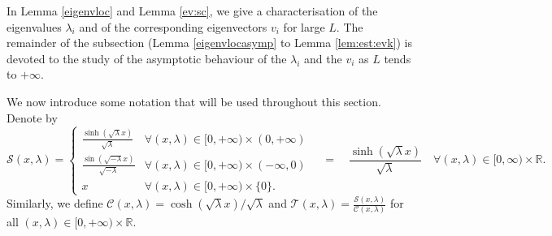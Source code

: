 \documentclass[11pt]{article}
\theoremstyle{plain}
\begin{document}
In Lemma \ref{eigenvloc} and Lemma \ref{ev:sc}, we give a characterisation of the eigenvalues $\lambda_i$ and of the corresponding eigenvectors $v_i$ for large $L$.  The remainder of the subsection (Lemma \ref{eigenvlocasymp}  to Lemma \ref{lem:est:evk})  is devoted to the study of the asymptotic behaviour of the $\lambda_i$ and the $v_i$ as $L$ tends to $+\infty$.

We now introduce some notation that will be used throughout this section. Denote by
\begin{equation}
\mathcal{S}(x,\lambda)=\begin{cases}
          \frac{\sinh\left(\sqrt{\lambda}x\right)}{\sqrt{\lambda}}&\forall (x,\lambda)\in [0,+\infty)\times(0,+\infty)\\
          \frac{\sin\left(\sqrt{-\lambda}x\right)}{\sqrt{-\lambda}} &\forall (x,\lambda)\in [0,+\infty)\times(-\infty,0)\\
          x &\forall(x,\lambda)\in[0,+\infty)\times \{0\}.
    \end{cases}\quad= \quad\frac{\sinh(\sqrt{\lambda}x)}{\sqrt{\lambda}} \quad \forall(x,\lambda)\in [0,\infty)\times\mathbb{R}.
\end{equation}
 Similarly, we define $\mathcal{C}(x,\lambda)=\cosh\left(\sqrt{\lambda}x\right)/\sqrt{\lambda}$ and $\mathcal{T}(x,\lambda)=\frac{\mathcal{S}(x,\lambda)}{\mathcal{C}(x,\lambda)}$  for all $(x,\lambda)\in [0,+\infty)\times \mathbb{R}$.
 
\end{document}
